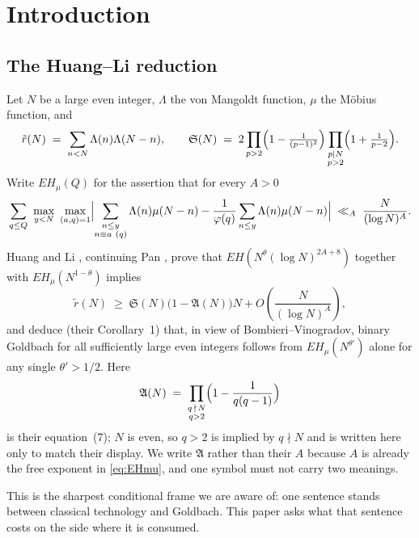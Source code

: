 \documentclass[11pt,a4paper]{article}
\theoremstyle{plain}
\theoremstyle{definition}
\theoremstyle{remark}
\renewcommand{\SS}{\mathfrak{S}}
\newcommand{\AAA}{\mathfrak{A}}
\begin{document}
\section{Introduction}

\subsection{The Huang--Li reduction}

Let $N$ be a large even integer, $\Lambda$ the von Mangoldt function,
$\mu$ the M\"obius function, and
\[
  \tilde r(N)\;=\;\sum_{n<N}\Lambda(n)\Lambda(N-n),
  \qquad
  \SS(N)\;=\;2\prod_{p>2}\Bigl(1-\tfrac{1}{(p-1)^2}\Bigr)
              \prod_{\substack{p\mid N\\ p>2}}\Bigl(1+\tfrac{1}{p-2}\Bigr).
\]
Write $EH_\mu(Q)$ for the assertion that for every $A>0$
\begin{equation}\label{eq:EHmu}
  \sum_{q\le Q}\ \max_{y<N}\ \max_{(a,q)=1}
  \Bigl|\sum_{\substack{n\le y\\ n\equiv a\ (q)}}\Lambda(n)\mu(N-n)
        -\frac{1}{\varphi(q)}\sum_{n\le y}\Lambda(n)\mu(N-n)\Bigr|
  \;\ll_A\;\frac{N}{(\log N)^A}.
\end{equation}
Huang and Li \cite{HL}, continuing Pan \cite{Pan}, prove that
$EH(N^{\theta}(\log N)^{2A+8})$ together with $EH_\mu(N^{1-\theta})$
implies
\begin{equation}\label{eq:HL22}
  \tilde r(N)\;\ge\;\SS(N)\bigl(1-\AAA(N)\bigr)N
    +O\!\left(\frac{N}{(\log N)^A}\right),
\end{equation}
and deduce (their Corollary~1) that, in view of Bombieri--Vinogradov,
binary Goldbach for all sufficiently large even integers follows from
$EH_\mu(N^{\theta'})$ alone for any single $\theta'>1/2$. Here
\begin{equation}\label{eq:AN}
  \AAA(N)\;=\;\prod_{\substack{q\,\nmid\,N\\ q>2}}
     \Bigl(1-\frac{1}{q(q-1)}\Bigr)
\end{equation}
is their equation~(7); $N$ is even, so $q>2$ is implied by $q\nmid N$
and is written here only to match their display. We write $\AAA$ rather than their $A$ because
$A$ is already the free exponent in \eqref{eq:EHmu}, and one symbol
must not carry two meanings.

This is the sharpest conditional frame we are aware of: one sentence
stands between classical technology and Goldbach. This paper asks what
that sentence costs on the side where it is consumed.
\end{document}
